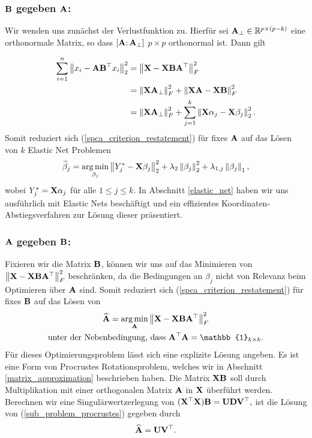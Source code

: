 \subsubsection{$\mathbf{B}$ gegeben $\mathbf{A}$:}

Wir wenden uns zunächst der Verlustfunktion zu. Hierfür sei $\mathbf{A}_{\perp} \in \mathbb{R}^{p \times (p-k)}$ eine orthonormale Matrix, so dass $[\mathbf{A} ; \mathbf{A}_{\perp}]$ $p \times p$ orthonormal ist. Dann gilt

\begin{align*}
\sum_{i=1}^{n} \left\lVert x_i - \mathbf{A}\mathbf{B}^{\top}x_i \right\rVert_2^2 & = \left\lVert \mathbf{X} - \mathbf{X} \mathbf{B} \mathbf{A}^{\top} \right\rVert_F^{2}\\
& = \left\lVert \mathbf{X} \mathbf{A}_{\perp} \right\rVert_F^2 + \left\lVert \mathbf{X} \mathbf{A} - \mathbf{X} \mathbf{B} \right\rVert_F^2\\
& = \left\lVert \mathbf{X} \mathbf{A}_{\perp} \right\rVert_F^2 + \sum_{j=1}^{k}\left\lVert \mathbf{X} \alpha_j - \mathbf{X}\beta_j \right\rVert_2^2.
\end{align*}
Somit reduziert sich (\ref{spca_criterion_restatement}) für fixes $\mathbf{A}$ auf das Lösen von $k$ Elastic Net Problemen
\begin{align}
\label{sub_problem_enet}
\widehat{\beta}_j = \operatorname*{arg\,min}_{\beta_j} \left\lVert Y_j^* - \mathbf{X} \beta_j \right\rVert_2^2 + \lambda_2 \left\lVert \beta_j \right\rVert_2^2 + \lambda_{1,j}\left\lVert \beta_j \right\rVert_1,
\end{align}
wobei $Y_j^* = \mathbf{X} \alpha_j$ für alle $1 \leq j \leq k$. In Abschnitt \ref{elastic_net} haben wir uns ausführlich mit Elastic Nets beschäftigt und ein effizientes Koordinaten-Abstiegsverfahren zur Lösung dieser präsentiert.

\subsubsection{$\mathbf{A}$ gegeben $\mathbf{B}$:}

Fixieren wir die Matrix $\mathbf{B}$, können wir uns auf das Minimieren von $\left\lVert \mathbf{X} - \mathbf{X} \mathbf{B} \mathbf{A}^{\top} \right\rVert_F^{2}$ beschränken, da die Bedingungen an $\beta_j$ nicht von Relevanz beim Optimieren über $\mathbf{A}$ sind. Somit reduziert sich (\ref{spca_criterion_restatement}) für fixes $\mathbf{B}$ auf das Lösen von
\begin{align}
\label{sub_problem_procrustes}
\begin{gathered}
\widehat{\mat A} = \argmin_{\mat A}\norm{\mat X - \mat X \mat B \mat A^{\top}}_F^2\\
\text{unter der Nebenbedingung, dass } \mat A^{\top} \mat A = \mat{\mathbb{1}}_{k \times k}.
\end{gathered}
\end{align}
Für dieses Optimierungsproblem lässt sich eine explizite Lösung angeben. Es ist eine Form von Procrustes Rotationsproblem, welches wir in Abschnitt \ref{matrix_approximation} beschrieben haben. Die Matrix $\mathbf{X} \mathbf{B}$ soll durch Multiplikation mit einer orthogonalen Matrix $\mathbf{A}$ in $\mathbf{X}$ überführt werden. Berechnen wir eine Singulärwertzerlegung von $(\mathbf{X}^{\top} \mathbf{X}) \mathbf{B} = \mathbf{U} \mathbf{D} \mathbf{V}^{\top},$ ist die Lösung von (\ref{sub_problem_procrustes}) gegeben durch
\begin{align}
\widehat{\mathbf{A}} = \mathbf{U} \mathbf{V}^{\top}.
\end{align}


